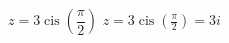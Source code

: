 { $z = 3\operatorname{cis}\left(\dfrac{\pi}{2}\right)$ }
{ $z = 3\operatorname{cis}\left(\frac{\pi}{2}\right) = 3i$ }
